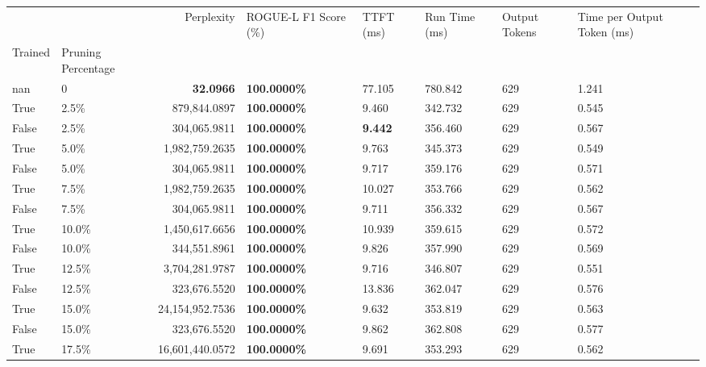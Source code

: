 \begin{table}[H]
\label{tab:evaluation-pipeline-1}
\begin{tabular}{|m{}| m{}| r | R{0.13\textwidth}| R{0.09\textwidth}| R{0.09\textwidth}| R{0.09\textwidth}| R{0.11\textwidth}}
\toprule
 &  & Perplexity & ROGUE-L F1 Score (\%) & TTFT (ms) & Run Time (ms) & Output Tokens & Time per Output Token (ms) \\
Trained & Pruning Percentage &  &  &  &  &  &  \\
\midrule
nan & 0 & \bfseries 32.0966 & \bfseries 100.0000\% & 77.105 & 780.842 & 629 & 1.241 \\
True & 2.5\% & 879,844.0897 & \bfseries \color{red} 100.0000\% & 9.460 & 342.732 & 629 & 0.545 \\
False & 2.5\% & 304,065.9811 & \bfseries \color{red} 100.0000\% & \bfseries \color{red} 9.442 & 356.460 & 629 & 0.567 \\
True & 5.0\% & 1,982,759.2635 & \bfseries \color{red} 100.0000\% & 9.763 & 345.373 & 629 & 0.549 \\
False & 5.0\% & 304,065.9811 & \bfseries \color{red} 100.0000\% & 9.717 & 359.176 & 629 & 0.571 \\
True & 7.5\% & 1,982,759.2635 & \bfseries \color{red} 100.0000\% & 10.027 & 353.766 & 629 & 0.562 \\
False & 7.5\% & 304,065.9811 & \bfseries \color{red} 100.0000\% & 9.711 & 356.332 & 629 & 0.567 \\
True & 10.0\% & 1,450,617.6656 & \bfseries \color{red} 100.0000\% & 10.939 & 359.615 & 629 & 0.572 \\
False & 10.0\% & 344,551.8961 & \bfseries \color{red} 100.0000\% & 9.826 & 357.990 & 629 & 0.569 \\
True & 12.5\% & 3,704,281.9787 & \bfseries \color{red} 100.0000\% & 9.716 & 346.807 & 629 & 0.551 \\
False & 12.5\% & 323,676.5520 & \bfseries \color{red} 100.0000\% & 13.836 & 362.047 & 629 & 0.576 \\
True & 15.0\% & 24,154,952.7536 & \bfseries \color{red} 100.0000\% & 9.632 & 353.819 & 629 & 0.563 \\
False & 15.0\% & 323,676.5520 & \bfseries \color{red} 100.0000\% & 9.862 & 362.808 & 629 & 0.577 \\
True & 17.5\% & 16,601,440.0572 & \bfseries \color{red} 100.0000\% & 9.691 & 353.293 & 629 & 0.562 \\

\end{tabular}
\end{table}
